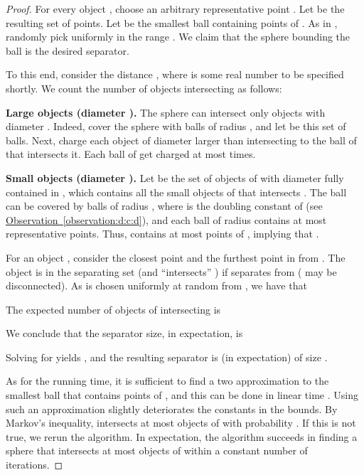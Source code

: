 \documentclass[12pt]{article}
\newlength{\savedparindent}
\newcommand{\SaveIndent}{\setlength{\savedparindent}{\parindent}}
\newcommand{\RestoreIndent}{\setlength{\parindent}{\savedparindent}}
\theoremstyle{remark}\theoremheaderfont{\sf}\theorembodyfont{\upshape}
\numberwithin{figure}{section}\numberwithin{table}{section}\numberwithin{equation}{section}
\newcommand{\HLink}[2]{\hyperref[#2]{#1~\ref*{#2}}}
\newcommand{\obsref}[1]{\HLink{Observation}{observation:#1}}
\begin{document}
\begin{proof}
  For every object , choose an arbitrary
  representative point . Let  be the
  resulting set of points. Let  be the smallest ball
  containing  points of . As in \cite{h-speps-13},
  randomly pick  uniformly in the range . We claim that
  the sphere  bounding the ball
   is the desired separator.

  To this end, consider the distance , where
   is some real number to be specified shortly.  We count
  the number of objects intersecting  as follows:

  \SaveIndent \medskip \begin{compactenum}[(A)]\RestoreIndent \item \textbf{Large objects (diameter ).} The sphere  can intersect only
     objects with diameter
    . Indeed, cover the sphere  with
     balls of radius , and let  be
    this set of balls. Next, charge each object of diameter larger
    than  intersecting  to the ball of  that
    intersects it.  Each ball of  get charged at most
     times.
\smallskip \item \textbf{Small objects (diameter ).} Let  be the set of objects of  with
    diameter  fully contained in
    , which contains all the small objects
    of  that intersects . The ball  can be
    covered by  balls of radius , where  is the
    doubling constant of  (see \obsref{d:c:d}), and each ball
    of radius  contains at most  representative points. Thus,
     contains at most  points of ,
    implying that .


    For an object , consider the closest
    point  and the furthest point  in  from
    .  The object  is in the separating set (and
    ``intersects'' ) if  separates  from
     ( may be disconnected).  As  is chosen uniformly
    at random from , we have that
    
    The expected number of objects of  intersecting
     is
    
  \end{compactenum}
  \smallskip We conclude that the separator size, in expectation, is
  
  Solving for  yields
  , and the resulting separator is (in
  expectation) of size
  .

  As for the running time, it is sufficient to find a two
  approximation to the smallest ball that contains  points of
  , and this can be done in linear time
  \cite{hr-nplta-13}. Using such an approximation slightly
  deteriorates the constants in the bounds. By Markov's inequality,
   intersects at most  objects of  with
  probability . If this is not true, we rerun the
  algorithm. In expectation, the algorithm succeeds in finding a
  sphere that intersects at most  objects of  within a
  constant number of iterations.
\end{proof}
\end{document}
